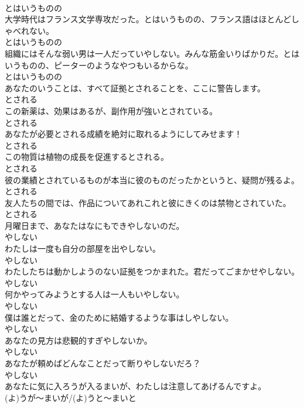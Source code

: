 \documentclass[8pt]{extreport}
\begin{document}
\begin{CJK}{UTF8}{min}
\\	とはいうものの
\\	大学時代はフランス文学専攻だった。とはいうものの、フランス語はほとんどしゃべれない。	
\\	とはいうものの
\\	組織にはそんな弱い男は一人だっていやしない。みんな筋金いりばかりだ。とはいうものの、ピーターのようなやつもいるからな。	
\\	とはいうものの
\\	あなたのいうことは、すべて証拠とされることを、ここに警告します。	
\\	とされる
\\	この新薬は、効果はあるが、副作用が強いとされている。	
\\	とされる
\\	あなたが必要とされる成績を絶対に取れるようにしてみせます！	
\\	とされる
\\	この物質は植物の成長を促進するとされる。	
\\	とされる
\\	彼の業績とされているものが本当に彼のものだったかというと、疑問が残るよ。	
\\	とされる
\\	友人たちの間では、作品についてあれこれと彼にきくのは禁物とされていた。	
\\	とされる
\\	月曜日まで、あなたはなにもできやしないのだ。	
\\	やしない
\\	わたしは一度も自分の部屋を出やしない。	
\\	やしない
\\	わたしたちは動かしようのない証拠をつかまれた。君だってごまかせやしない。	
\\	やしない
\\	何かやってみようとする人は一人もいやしない。	
\\	やしない
\\	僕は誰とだって、金のために結婚するような事はしやしない。	
\\	やしない
\\	あなたの見方は悲観的すぎやしないか。	
\\	やしない
\\	あなたが頼めばどんなことだって断りやしないだろ？	
\\	やしない
\\	あなたに気に入ろうが入るまいが、わたしは注意してあげるんですよ。	
\\	(よ)うが～まいが/(よ)うと～まいと

\end{CJK}
\end{document}
